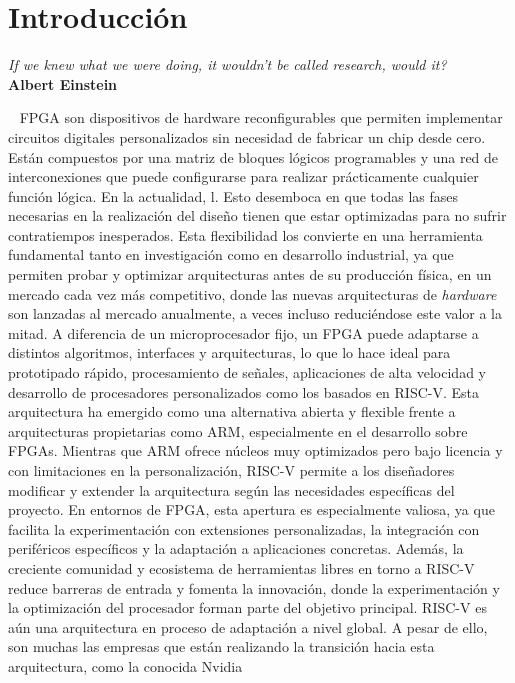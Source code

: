 \chapter{Introducción}

\vspace{-0.5cm}

\begin{flushright}
  \emph{\guillemotleft If we knew what we were doing, it wouldn't be
    called research, would it?\guillemotright}\\ \textbf{Albert Einstein}
\end{flushright}
\grayMinitoc

\parindent=16mm

~ \ac{FPGA} son dispositivos de hardware reconfigurables que permiten implementar circuitos digitales personalizados sin necesidad de fabricar un chip desde cero. Están compuestos por una matriz de bloques lógicos programables y una red de interconexiones que puede configurarse para realizar prácticamente cualquier función lógica. En la actualidad, l. Esto desemboca en que todas las fases necesarias en la realización del diseño tienen que estar optimizadas para no sufrir contratiempos inesperados. Esta flexibilidad los convierte en una herramienta fundamental tanto en investigación como en desarrollo industrial, ya que permiten probar y optimizar arquitecturas antes de su producción física, en un mercado cada vez más competitivo, donde las nuevas arquitecturas de \textit{hardware} son lanzadas al mercado anualmente, a veces incluso reduciéndose este valor a la mitad. A diferencia de un microprocesador fijo, un FPGA puede adaptarse a distintos algoritmos, interfaces y arquitecturas, lo que lo hace ideal para prototipado rápido, procesamiento de señales, aplicaciones de alta velocidad y desarrollo de procesadores personalizados como los basados en \ac{RISC-V}. Esta arquitectura ha emergido como una alternativa abierta y flexible frente a arquitecturas propietarias como \ac{ARM}, especialmente en el desarrollo sobre FPGAs. Mientras que ARM ofrece núcleos muy optimizados pero bajo licencia y con limitaciones en la personalización, RISC-V permite a los diseñadores modificar y extender la arquitectura según las necesidades específicas del proyecto. En entornos de FPGA, esta apertura es especialmente valiosa, ya que facilita la experimentación con extensiones personalizadas, la integración con periféricos específicos y la adaptación a aplicaciones concretas. Además, la creciente comunidad y ecosistema de herramientas libres en torno a RISC-V reduce barreras de entrada y fomenta la innovación, donde la experimentación y la optimización del procesador forman parte del objetivo principal. RISC-V es aún una arquitectura en proceso de adaptación a nivel global. A pesar de ello, son muchas las empresas que están realizando la transición hacia esta arquitectura, como la conocida Nvidia 